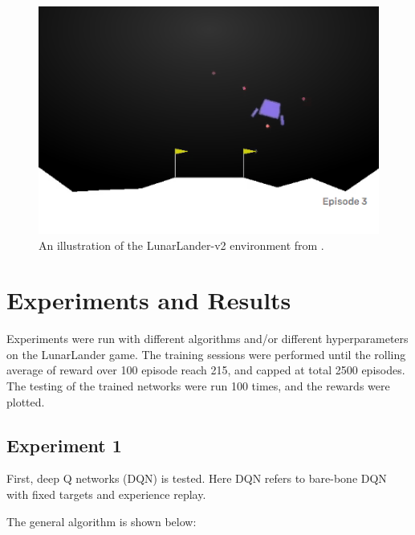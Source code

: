 \documentclass[10pt]{article}
\begin{document}
\begin{figure}[h!]
  \centering
  \includegraphics[width=0.5\linewidth]{illustration.png}
    \caption{An illustration of the LunarLander-v2 environment from .}
  \label{fig:lunarlander}
\end{figure}


\section{Experiments and Results} \label{experiments}
Experiments were run with different algorithms and/or different hyperparameters on the LunarLander game. The training sessions were performed until the rolling average of reward over 100 episode reach 215, and capped at total 2500 episodes. The testing of the trained networks were run 100 times, and the rewards were plotted.

\par




\subsection{Experiment 1} \label{experiment1}
First, deep Q networks (DQN) is tested. Here DQN refers to bare-bone DQN with fixed targets and experience replay. \par
\noindent
The general algorithm is shown below:\par
\end{document}
